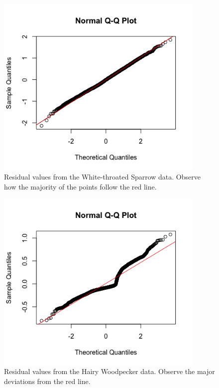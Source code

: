 \begin{figure}[h]
\centering
\includegraphics[width=10cm]{figures/whtspa_qqplot.png}
\caption{Residual values from the White-throated Sparrow data. Observe how the majority of the points follow the red line.}
\end{figure}

\begin{figure}[h]
\centering
\includegraphics[width=10cm]{figures/haiwoo_qqplot.png}
\caption{Residual values from the Hairy Woodpecker data. Observe the major deviations from the red line.}
\end{figure}

